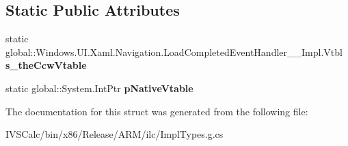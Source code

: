 \subsection*{Static Public Attributes}
\begin{DoxyCompactItemize}
\item 
\mbox{\label{struct_windows_1_1_u_i_1_1_xaml_1_1_navigation_1_1_load_completed_event_handler_____impl_1_1_vtbl_a4646433aaf513d16604aa80abeb32c68}} 
static global\+::\+Windows.\+U\+I.\+Xaml.\+Navigation.\+Load\+Completed\+Event\+Handler\+\_\+\+\_\+\+Impl.\+Vtbl {\bfseries s\+\_\+the\+Ccw\+Vtable}
\item 
\mbox{\label{struct_windows_1_1_u_i_1_1_xaml_1_1_navigation_1_1_load_completed_event_handler_____impl_1_1_vtbl_ac6678cca22ae7d8633aea2f78e56804c}} 
static global\+::\+System.\+Int\+Ptr {\bfseries p\+Native\+Vtable}
\end{DoxyCompactItemize}


The documentation for this struct was generated from the following file\+:\begin{DoxyCompactItemize}
\item 
I\+V\+S\+Calc/bin/x86/\+Release/\+A\+R\+M/ilc/Impl\+Types.\+g.\+cs\end{DoxyCompactItemize}
